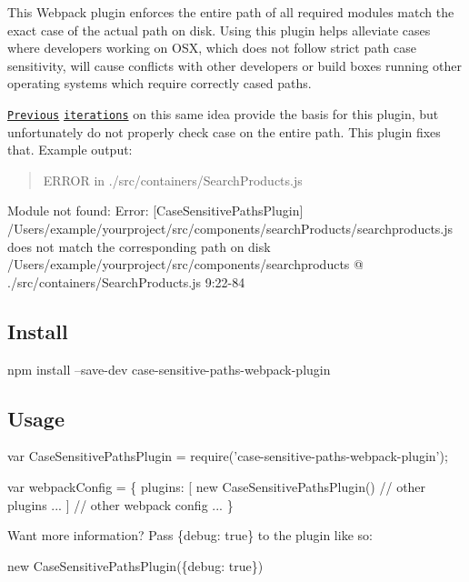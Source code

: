 This Webpack plugin enforces the entire path of all required modules match the exact case of the actual path on disk. Using this plugin helps alleviate cases where developers working on O\+SX, which does not follow strict path case sensitivity, will cause conflicts with other developers or build boxes running other operating systems which require correctly cased paths.

\href{https://gist.github.com/Morhaus/333579c2a5b4db644bd50}{\tt Previous} \href{https://github.com/dcousineau/force-case-sensitivity-webpack-plugin}{\tt iterations} on this same idea provide the basis for this plugin, but unfortunately do not properly check case on the entire path. This plugin fixes that. Example output\+:

\begin{quote}
E\+R\+R\+OR in ./src/containers/\+Search\+Products.js \end{quote}
Module not found\+: Error\+: \mbox{[}Case\+Sensitive\+Paths\+Plugin\mbox{]} {\ttfamily /\+Users/example/yourproject/src/components/search\+Products/searchproducts.js} does not match the corresponding path on disk {\ttfamily /\+Users/example/yourproject/src/components/searchproducts} @ ./src/containers/\+Search\+Products.js 9\+:22-\/84

\subsection*{Install }

npm install --save-\/dev case-\/sensitive-\/paths-\/webpack-\/plugin

\subsection*{Usage }


\begin{DoxyCode}
var CaseSensitivePathsPlugin = require('case-sensitive-paths-webpack-plugin');

var webpackConfig = \{
    plugins: [
        new CaseSensitivePathsPlugin()
        // other plugins ...
    ]
    // other webpack config ...
\}
\end{DoxyCode}


Want more information? Pass {\ttfamily \{debug\+: true\}} to the plugin like so\+:


\begin{DoxyCode}
new CaseSensitivePathsPlugin(\{debug: true\})
\end{DoxyCode}


